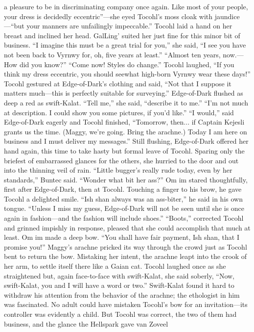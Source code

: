 \documentclass[9pt]{article}
\begin{document}
a pleasure to be in discriminating company once again. Like most of your people, your dress is decidedly
eccentric”—she eyed Tocohl’s moss cloak with jaundice—“but your manners are unfailingly
impeccable.”
Tocohl laid a hand on her breast and inclined her head. GalLing’ suited her just fine for this minor bit
of business. “I imagine this must be a great trial for you,” she said, “I see you have not been back to
Vyrnwy for, oh, five years at least.”
“Almost ten years, now.—How did you know?”
“Come now! Styles do change.” Tocohl laughed, “If you think my dress eccentric, you should seewhat high-born Vyrnwy wear these days!” Tocohl gestured at Edge-of-Dark’s clothing and said, “Not
that I suppose it matters much—this is perfectly suitable for surveying.”
Edge-of-Dark flushed as deep a red as swift-Kalat. “Tell me,” she said, “describe it to me.”
“I’m not much at description. I could show you some pictures, if you’d like.”
“I would,” said Edge-of-Dark eagerly and Tocohl finished, “Tomorrow, then... if Captain Kejesli
grants us the time. (Maggy, we’re going. Bring the arachne.) Today I am here on business and I must
deliver my messages.”
Still flushing, Edge-of-Dark offered her hand again, this time to take hasty but formal leave of Tocohl.
Sparing only the briefest of embarrassed glances for the others, she hurried to the door and out into the
thinning veil of rain.
“Little bugger’s really rude today, even by her standards,” Buntec said. “Wonder what bit her ass?”
Om im stared thoughtfully, first after Edge-of-Dark, then at Tocohl. Touching a finger to his brow, he
gave Tocohl a delighted smile. “Ish shan always was an ass-biter,” he said in his own tongue. “Unless I
miss my guess, Edge-of-Dark will not be seen until she is once again in fashion—and the fashion will
include shoes.”
“Boots,” corrected Tocohl and grinned impishly in response, pleased that she could accomplish that
much at least.
Om im made a deep bow. “You shall have fair payment, Ish shan, that I promise you!”
Maggy’s arachne pricked its way through the crowd just as Tocohl bent to return the bow. Mistaking
her intent, the arachne leapt into the crook of her arm, to settle itself there like a Gaian cat. Tocohl
laughed once as she straightened but, again face-to-face with swift-Kalat, she said soberly, “Now,
swift-Kalat, you and I will have a word or two.”
Swift-Kalat found it hard to withdraw his attention from the behavior of the arachne; the ethologist in
him was fascinated. No adult could have mistaken Tocohl’s bow for an invitation—its controller was
evidently a child.
But Tocohl was correct, the two of them had business, and the glance the Hellspark gave van Zoveel
\end{document}
